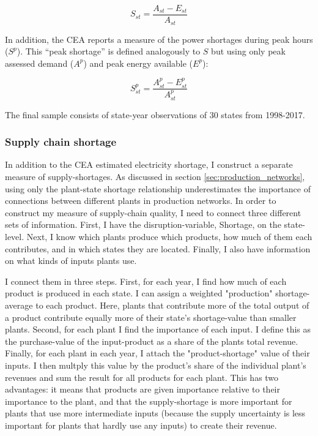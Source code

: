 \documentclass[11pt]{article}
\begin{document}
\[
S_{st} = \frac{A_{st} - E_{st} }{A_{st}}
\]

In addition, the CEA reports a measure of the power shortages during peak hours (\(S^p\)). This ``peak shortage'' is defined analogously to \(S\) but using only peak assessed demand (\(A^{p}\)) and peak energy available (\(E^p\)):

\[
S^{p}_{st} = \frac{A^{p}_{st} - E^{p}_{st}}{A^{p}_{st}}
\]

The final sample consists of state-year observations of 30 states from 1998-2017. 

\subsubsection{Supply chain shortage}%
\label{sub:supply_chain_quality}

In addition to the CEA estimated electricity shortage, I construct a separate measure of supply-shortages. As discussed in section \ref{sec:production_networks}, using only the plant-state shortage relationship underestimates the importance of connections between different plants in production networks. In order to construct my measure of supply-chain quality, I need to connect three different sets of information. First, I have the disruption-variable, Shortage, on the state-level. Next, I know which plants produce which products, how much of them each contributes, and in which states they are located. Finally, I also have information on what kinds of inputs plants use.

I connect them in three steps. First, for each year, I find how much of each product is produced in each state. I can assign a weighted "production" shortage-average to each product. Here, plants that contribute more of the total output of a product contribute equally more of their state's shortage-value than smaller plants. Second, for each plant I find the importance of each input. I define this as the purchase-value of the input-product as a share of the plants total revenue. Finally, for each plant in each year, I attach the "product-shortage" value of their inputs. I then multply this value by the product's share of the individual plant's revenues and sum the result for all products for each plant. This has two advantages: it means that products are given importance relative to their importance to the plant, and that the supply-shortage is more important for plants that use more intermediate inputs (because the supply uncertainty is less important for plants that hardly use any inputs) to create their revenue.
\end{document}
